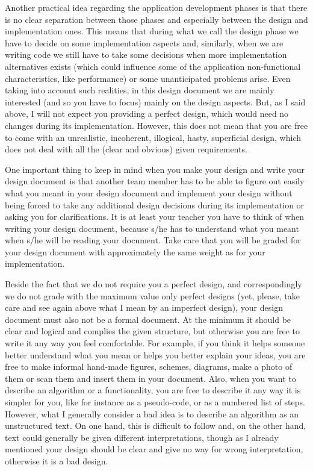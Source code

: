 Another practical idea regarding the application development phases is that there is no clear separation between those phases and especially between the design and implementation ones. This means that during what we call the design phase we have to decide on some implementation aspects and, similarly, when we are writing code we still have to take some decisions when more implementation alternatives exists (which could influence some of the application non-functional characteristics, like performance) or some unanticipated problems arise. Even taking into account such realities, in this design document we are mainly interested (and so you have to focus) mainly on the design aspects. But, as I said above, I will not expect you providing a perfect design, which would need no changes during its implementation. However, this does not mean that you are free to come with an unrealistic, incoherent, illogical, hasty, superficial design, which does not deal with all the (clear and obvious) given requirements. 

One important thing to keep in mind when you make your design and write your design document is that another team member has to be able to figure out easily what you meant in your design document and implement your design without being forced to take any additional design decisions during its implementation or asking you for clarifications. It is at least your teacher you have to think of when writing your design document, because s/he has to understand what you meant when s/he will be reading your document. Take care that you will be graded for your design document with approximately the same weight as for your implementation. 

Beside the fact that we do not require you a perfect design, and correspondingly we do not grade with the maximum value only perfect designs (yet, please, take care and see again above what I mean by an imperfect design), your design document must also not be a formal document. At the minimum it should be clear and logical and complies the given structure, but otherwise you are free to write it any way you feel comfortable. For example, if you think it helps someone better understand what you mean or helps you better explain your ideas, you are free to make informal hand-made figures, schemes, diagrams, make a photo of them or scan them and insert them in your document. Also, when you want to describe an algorithm or a functionality, you are free to describe it any way it is simpler for you, like for instance as a pseudo-code, or as a numbered list of steps. However, what I generally consider a bad idea is to describe an algorithm as an unstructured text. On one hand, this is difficult to follow and, on the other hand, text could generally be given different interpretations, though as I already mentioned your design should be clear and give no way for wrong interpretation, otherwise it is a bad design. 


